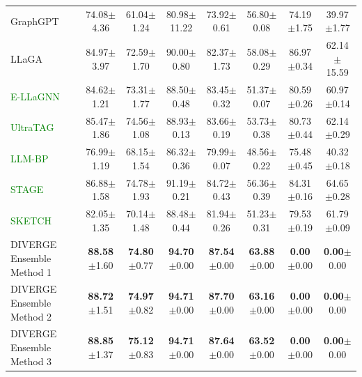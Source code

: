 \documentclass[a4paper,fleqn]{cas-sc}
\newcommand{\revthree}[1]{\textcolor{green}{#1}} %
\begin{document}
\begin{table}[htbp]
\begin{tabular*}{\textwidth}{@{\extracolsep{\fill}} lccccccc @{}}
GraphGPT     & 74.08{\scriptsize$\pm$4.36} & 61.04{\scriptsize$\pm$1.24} & 80.98{\scriptsize$\pm$11.22} & 73.92{\scriptsize$\pm$0.61} & 56.80{\scriptsize$\pm$0.08} & 74.19{\scriptsize$\pm$1.75} & 39.97{\scriptsize$\pm$1.77} \\
LLaGA        & 84.97{\scriptsize$\pm$3.97} & 72.59{\scriptsize$\pm$1.70} & 90.00{\scriptsize$\pm$0.80} & 82.37{\scriptsize$\pm$1.73} & 58.08{\scriptsize$\pm$0.29} & 86.97{\scriptsize$\pm$0.34} & 62.14{\scriptsize$\pm$15.59} \\
\revthree{E-LLaGNN}     & 84.62{\scriptsize$\pm$1.21} & 73.31{\scriptsize$\pm$1.77} & 88.50{\scriptsize$\pm$0.48} & 83.45{\scriptsize$\pm$0.32} & 51.37{\scriptsize$\pm$0.07} & 80.59{\scriptsize$\pm$0.26} & 60.97{\scriptsize$\pm$0.14} \\
\revthree{UltraTAG}     & 85.47{\scriptsize$\pm$1.86} & 74.56{\scriptsize$\pm$1.08} & 88.93{\scriptsize$\pm$0.13} & 83.66{\scriptsize$\pm$0.19} & 53.73{\scriptsize$\pm$0.38} & 80.73{\scriptsize$\pm$0.44} & 62.14{\scriptsize$\pm$0.29} \\
\revthree{LLM-BP}       & 76.99{\scriptsize$\pm$1.19} & 68.15{\scriptsize$\pm$1.54} & 86.32{\scriptsize$\pm$0.36} & 79.99{\scriptsize$\pm$0.07} & 48.56{\scriptsize$\pm$0.22} & 75.48{\scriptsize$\pm$0.45} & 40.32{\scriptsize$\pm$0.18} \\
\revthree{STAGE}        & 86.88{\scriptsize$\pm$1.58} & 74.78{\scriptsize$\pm$1.93} & 91.19{\scriptsize$\pm$0.21} & 84.72{\scriptsize$\pm$0.43} & 56.36{\scriptsize$\pm$0.39} & 84.31{\scriptsize$\pm$0.16} & 64.65{\scriptsize$\pm$0.28} \\
\revthree{SKETCH}       & 82.05{\scriptsize$\pm$1.35} & 70.14{\scriptsize$\pm$1.48} & 88.48{\scriptsize$\pm$0.44} & 81.94{\scriptsize$\pm$0.26} & 51.23{\scriptsize$\pm$0.31} & 79.53{\scriptsize$\pm$0.19} & 61.79{\scriptsize$\pm$0.09} \\
\midrule

DIVERGE Ensemble Method 1 & \textbf{88.58}{\scriptsize$\pm$1.60} & \textbf{74.80}{\scriptsize$\pm$0.77} & \textbf{94.70}{\scriptsize$\pm$0.00} & \textbf{87.54}{\scriptsize$\pm$0.00} & \textbf{63.88}{\scriptsize$\pm$0.00} & \textbf{0.00}{\scriptsize$\pm$0.00} & \textbf{0.00}{\scriptsize$\pm$0.00} \\
DIVERGE Ensemble Method 2 & \textbf{88.72}{\scriptsize$\pm$1.51} & \textbf{74.97}{\scriptsize$\pm$0.82} & \textbf{94.71}{\scriptsize$\pm$0.00} & \textbf{87.70}{\scriptsize$\pm$0.00} & \textbf{63.16}{\scriptsize$\pm$0.00} & \textbf{0.00}{\scriptsize$\pm$0.00} & \textbf{0.00}{\scriptsize$\pm$0.00} \\
DIVERGE Ensemble Method 3 & \textbf{88.85}{\scriptsize$\pm$1.37} & \textbf{75.12}{\scriptsize$\pm$0.83} & \textbf{94.71}{\scriptsize$\pm$0.00} & \textbf{87.64}{\scriptsize$\pm$0.00} & \textbf{63.52}{\scriptsize$\pm$0.00} & \textbf{0.00}{\scriptsize$\pm$0.00} & \textbf{0.00}{\scriptsize$\pm$0.00} \\
\bottomrule
\end{tabular*}
\end{table}
\end{document}

